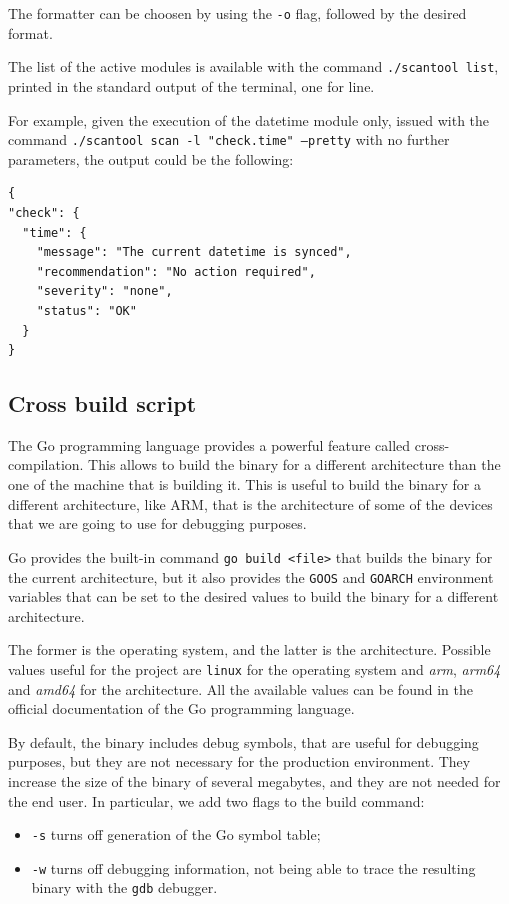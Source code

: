 The formatter can be choosen by using the \texttt{-o} flag, followed by the desired format.

The list of the active modules is available with the command \texttt{./scantool list}, printed in the standard output of the terminal, one for line.

For example, given the execution of the datetime module only, issued with the command \texttt{./scantool scan -l "check.time" --pretty} with no further parameters, the output could be the following:

\begin{lstlisting}[style=json, caption={Output of the datetime module}]
{
"check": {
  "time": {
    "message": "The current datetime is synced",
    "recommendation": "No action required",
    "severity": "none",
    "status": "OK"
  }
}
\end{lstlisting}

\subsection{Cross build script}

The Go programming language provides a powerful feature called cross-compilation. This allows to build the binary for a different architecture than the one of the machine that is building it. This is useful to build the binary for a different architecture, like ARM, that is the architecture of some of the devices that we are going to use for debugging purposes.

Go provides the built-in command \texttt{go build <file>} that builds the binary for the current architecture, but it also provides the \texttt{GOOS} and \texttt{GOARCH} environment variables that can be set to the desired values to build the binary for a different architecture.

The former is the operating system, and the latter is the architecture. Possible values useful for the project are \texttt{linux} for the operating system and \textit{arm}, \textit{arm64} and \textit{amd64} for the architecture. All the available values can be found in the official documentation of the Go programming language.~\cite{go-valid-goos-goarch-combinations}

By default, the binary includes debug symbols, that are useful for debugging purposes, but they are not necessary for the production environment. They increase the size of the binary of several megabytes, and they are not needed for the end user. In particular, we add two flags to the build command:~\cite{go-ldflags-all,go-ldflags-s-w}
\begin{itemize}
  \item \texttt{-s} turns off generation of the Go symbol table;
  \item \texttt{-w} turns off debugging information, not being able to trace the resulting binary with the \texttt{gdb} debugger.
\end{itemize}

